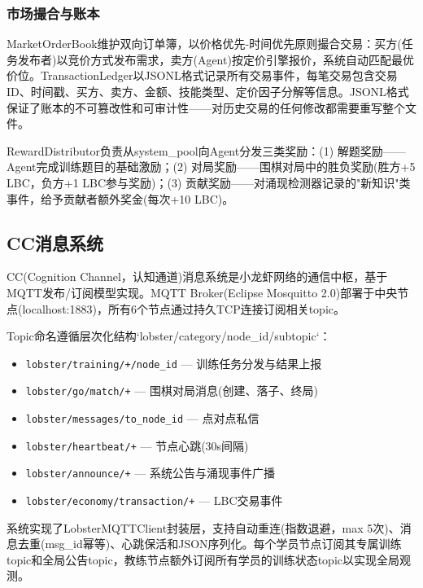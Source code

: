 \documentclass[12pt,a4paper]{ctexart}
\begin{document}
\subsubsection{市场撮合与账本}

MarketOrderBook维护双向订单簿，以价格优先-时间优先原则撮合交易：买方(任务发布者)以竞价方式发布需求，卖方(Agent)按定价引擎报价，系统自动匹配最优价位。TransactionLedger以JSONL格式记录所有交易事件，每笔交易包含交易ID、时间戳、买方、卖方、金额、技能类型、定价因子分解等信息。JSONL格式保证了账本的不可篡改性和可审计性——对历史交易的任何修改都需要重写整个文件。

RewardDistributor负责从system\_pool向Agent分发三类奖励：(1) 解题奖励——Agent完成训练题目的基础激励；(2) 对局奖励——围棋对局中的胜负奖励(胜方+5 LBC，负方+1 LBC参与奖励)；(3) 贡献奖励——对涌现检测器记录的"新知识"类事件，给予贡献者额外奖金(每次+10 LBC)。

\subsection{CC消息系统}

CC(Cognition Channel，认知通道)消息系统是小龙虾网络的通信中枢，基于MQTT发布/订阅模型实现。MQTT Broker(Eclipse Mosquitto 2.0)部署于中央节点(localhost:1883)，所有6个节点通过持久TCP连接订阅相关topic。

Topic命名遵循层次化结构`lobster/{category}/{node_id}/{subtopic}`：

\begin{itemize}[leftmargin=2em]
  \item \texttt{lobster/training/+/{node\_id}} — 训练任务分发与结果上报
  \item \texttt{lobster/go/match/+} — 围棋对局消息(创建、落子、终局)
  \item \texttt{lobster/messages/to\_{node\_id}} — 点对点私信
  \item \texttt{lobster/heartbeat/+} — 节点心跳(30s间隔)
  \item \texttt{lobster/announce/+} — 系统公告与涌现事件广播
  \item \texttt{lobster/economy/transaction/+} — LBC交易事件
\end{itemize}

系统实现了LobsterMQTTClient封装层，支持自动重连(指数退避，max 5次)、消息去重(msg\_id幂等)、心跳保活和JSON序列化。每个学员节点订阅其专属训练topic和全局公告topic，教练节点额外订阅所有学员的训练状态topic以实现全局观测。

\end{document}
